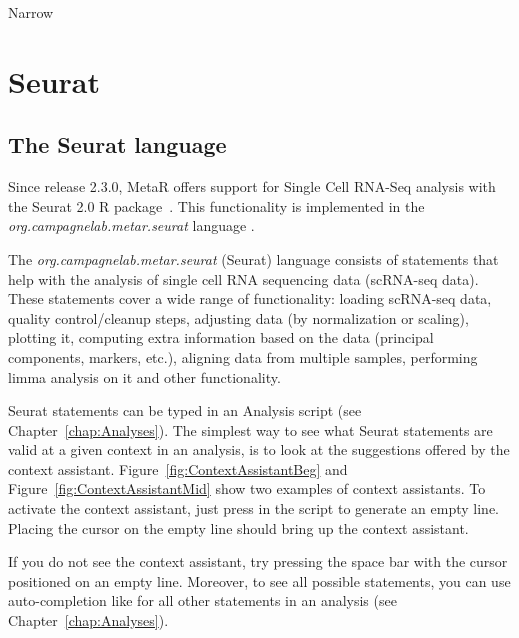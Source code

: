 Narrow


\chapter{Seurat}\label{chap:Seurat}

\section{The Seurat language}

Since release 2.3.0, MetaR offers support for Single Cell RNA-Seq analysis with the Seurat 2.0 R package~\cite{butler2017integrated}. This functionality is implemented in the \textit{org.campagnelab.metar.seurat} language .

The \textit{org.campagnelab.metar.seurat} (Seurat) language consists of statements that help with the analysis of
single cell RNA sequencing data (scRNA-seq data). These statements cover a wide range of
functionality: loading scRNA-seq data, quality control/cleanup steps, adjusting data (by normalization
or scaling), plotting it, computing extra information based on the data (principal components, markers,
etc.), aligning data from multiple samples, performing limma analysis on it and other
functionality.

Seurat statements can be typed in an Analysis script (see Chapter~\ref{chap:Analyses}).
The simplest way to see what Seurat statements are valid at a given context in an
analysis, is to look at the suggestions offered by the context assistant. Figure~\ref{fig:ContextAssistantBeg}
and Figure~\ref{fig:ContextAssistantMid} show two examples of context assistants.
To activate the context assistant, just press
\keys{\return} in the script to generate an empty line. Placing the cursor on the empty line should
bring up the context assistant. 

\begin{remark}
If you do not see the context assistant, try pressing the space bar with the cursor positioned on an empty line.
Moreover, to see all possible statements, you can use auto-completion like for all other
statements in an analysis (see Chapter~\ref{chap:Analyses}).
\end{remark}


